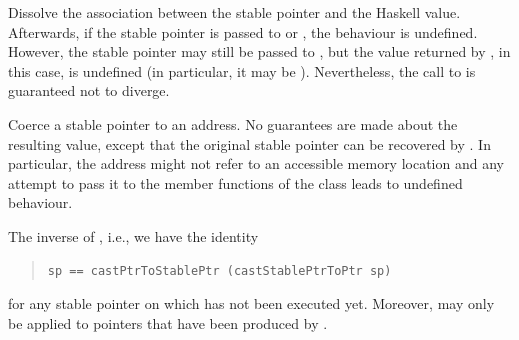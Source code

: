 \begin{haddockdesc}
\item[\begin{tabular}{@{}l}
freeStablePtr :: StablePtr a -> IO ()
\end{tabular}]
{\haddockbegindoc
Dissolve the association between the stable pointer and the Haskell
 value. Afterwards, if the stable pointer is passed to
  or , the behaviour is
 undefined.  However, the stable pointer may still be passed to
 , but the  value returned
 by , in this case, is undefined (in particular,
 it may be ).  Nevertheless, the call
 to  is guaranteed not to diverge.\par}
\end{haddockdesc}
\begin{haddockdesc}
\item[\begin{tabular}{@{}l}
castStablePtrToPtr :: StablePtr a -> Ptr ()
\end{tabular}]
{\haddockbegindoc
Coerce a stable pointer to an address. No guarantees are made about
 the resulting value, except that the original stable pointer can be
 recovered by .  In particular, the address might not
 refer to an accessible memory location and any attempt to pass it to
 the member functions of the class  leads to
 undefined behaviour.\par}
\end{haddockdesc}
\begin{haddockdesc}
\item[\begin{tabular}{@{}l}
castPtrToStablePtr :: Ptr () -> StablePtr a
\end{tabular}]
{\haddockbegindoc
The inverse of , i.e., we have the identity\par
\begin{quote}
{\haddockverb\begin{verbatim}
sp == castPtrToStablePtr (castStablePtrToPtr sp)\end{verbatim}}
\end{quote}
for any stable pointer  on which  has
 not been executed yet.  Moreover,  may
 only be applied to pointers that have been produced by
 .\par}
\end{haddockdesc}
